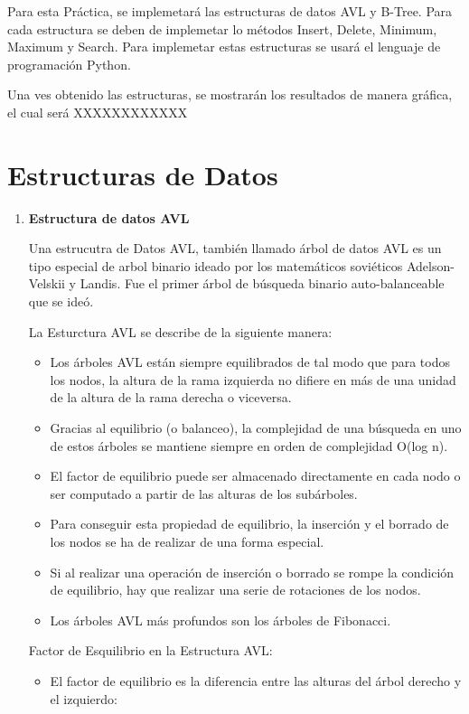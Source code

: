 \documentclass{article}
\begin{document}
	Para esta Práctica, se implemetará las estructuras de datos AVL y B-Tree. Para cada estructura se deben de implemetar lo métodos Insert, Delete, Minimum, Maximum y Search. Para implemetar estas estructuras se usará el lenguaje de programación Python.

    Una ves obtenido las estructuras, se mostrarán los resultados de manera gráfica, el cual será XXXXXXXXXXXX
	
	
	\section{Estructuras de Datos}\label{sec:ejercicios}
	\begin{enumerate}
		\item \textbf{Estructura de datos AVL}
		
			Una estrucutra de Datos AVL, también llamado árbol de datos AVL es un tipo especial de arbol binario ideado por los matemáticos soviéticos Adelson-Velskii y Landis. Fue el primer árbol de búsqueda binario auto-balanceable que se ideó.

La Esturctura AVL se describe de la siguiente manera: 

\begin{itemize}
   \item Los árboles AVL están siempre equilibrados de tal modo que para todos los nodos, la altura de la rama izquierda no difiere en más de una unidad de la altura de la rama derecha o viceversa.
   \item Gracias al equilibrio (o balanceo), la complejidad de una búsqueda en uno de estos árboles se mantiene siempre en orden de complejidad O(log n).
   \item El factor de equilibrio puede ser almacenado directamente en cada nodo o ser computado a partir de las alturas de los subárboles.
   \item Para conseguir esta propiedad de equilibrio, la inserción y el borrado de los nodos se ha de realizar de una forma especial.
   \item Si al realizar una operación de inserción o borrado se rompe la condición de equilibrio, hay que realizar una serie de rotaciones de los nodos.
   \item Los árboles AVL más profundos son los árboles de Fibonacci.
\end{itemize}	

 Factor de Esquilibrio en la Estructura AVL:

 \begin{itemize}
   \item El factor de equilibrio es la diferencia entre las alturas del árbol derecho y el izquierdo:
   

\end{itemize}
\end{enumerate}
\end{document}
